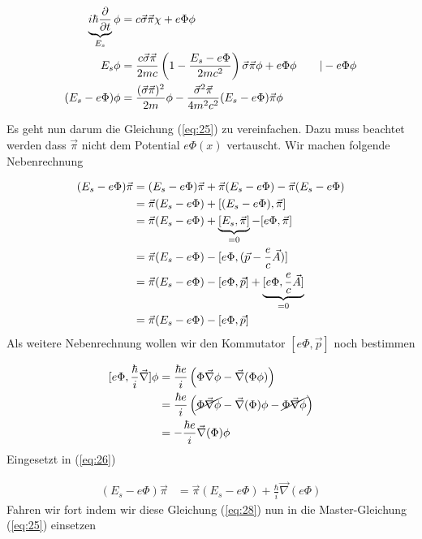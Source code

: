 \begin{align}
  \label{eq:25}
  \underbr{ i\hbar\pdiff_t}_{E_s}\phi &= c\vec\sigma\vec\pi\chi + e\Phi\phi \notag\\
 E_s\phi &= \frac{c\vec\sigma\vec\pi }{2mc}\left(1 - \frac{E_s-e\Phi}{2mc^2} \right)\vec\sigma\vec\pi\phi  + e\Phi\phi \qquad |-e\Phi\phi  \notag\\
 (E_s-e\Phi)\phi &= \frac{(\vec\sigma\vec\pi)^2 }{2m}\phi - \frac{\vec\sigma^2\vec\pi }{4m^2c^2} (E_s-e\Phi) \vec\pi\phi 
\end{align}

Es geht nun darum die Gleichung (\ref{eq:25}) zu vereinfachen. Dazu muss beachtet werden dass \(\vec \pi\) nicht dem Potential \(e\Phi(x)\) vertauscht. Wir machen folgende Nebenrechnung

\begin{align}
  \label{eq:26}
  (E_s-e\Phi)\vec\pi &= (E_s-e\Phi)\vec\pi + \vec\pi(E_s-e\Phi) - \vec\pi(E_s-e\Phi) \notag\\
&= \vec\pi(E_s-e\Phi) + [(E_s-e\Phi),\vec\pi ] \notag\\
&= \vec\pi(E_s-e\Phi) + \underbr{[E_s,\vec\pi ]}_{=0}-[e\Phi,\vec\pi ] \notag\\
&=\vec\pi(E_s-e\Phi) -[e\Phi,(\vec p -\frac{e}{c}\vec A) ]  \notag\\
&=\vec\pi(E_s-e\Phi) -[e\Phi,\vec p  ]  + \underbr{[e\Phi,\frac{e}{c}\vec A ]}_{=0}  \notag\\
&=\vec\pi(E_s-e\Phi) -[e\Phi,\vec p  ] 
\end{align}
Als weitere Nebenrechnung wollen wir den Kommutator \([e\Phi,\vec p  ] \) noch bestimmen

\begin{align}
  \label{eq:27}
  [e\Phi,\frac{\hbar}{i}\vec \nabla ]\phi &= \frac{\hbar e}{i}\left(\Phi\vec\nabla\phi -\vec\nabla( \Phi \phi)   \right) \notag\\
&= \frac{\hbar e}{i}\left(\cancel{\Phi\vec\nabla\phi} - \vec\nabla( \Phi) \phi - \cancel{\Phi\vec\nabla\phi}  \right) \notag\\
&= - \frac{\hbar e}{i}\vec\nabla( \Phi) \phi
\end{align}
Eingesetzt in (\ref{eq:26})

\begin{align}
  \label{eq:28}
  (E_s-e\Phi)\vec\pi &=\vec\pi(E_s-e\Phi) + \frac{\hbar}{i}\vec\nabla(e\Phi)
\end{align}
Fahren wir fort indem wir diese Gleichung (\ref{eq:28}) nun in die Master-Gleichung (\ref{eq:25}) einsetzen

